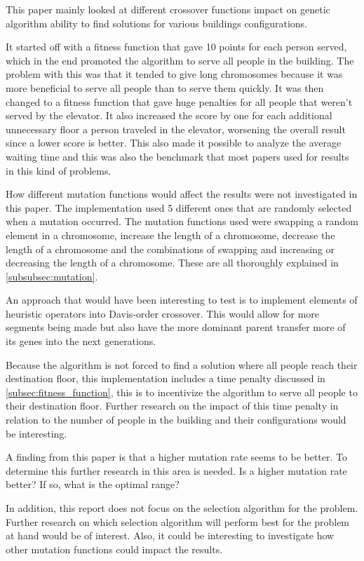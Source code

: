 
This paper mainly looked at different crossover functions impact on genetic algorithm ability to find solutions for various buildings configurations.

It started off with a fitness function that gave 10 points for each person served, which in the end promoted the algorithm to serve all people in the building.
The problem with this was that it tended to give long chromosomes because it was more beneficial to serve all people than to serve them quickly.
It was then changed to a fitness function that gave huge penalties for all people that weren't served by the elevator. It also increased the score by one for each additional unnecessary floor a person traveled in the elevator, worsening the overall result since a lower score is better.
This also made it possible to analyze the average waiting time and this was also the benchmark that most papers used for results in this kind of problems.

How different mutation functions would affect the results were not investigated in this paper. The implementation used 5 different ones that are randomly selected when a mutation occurred.
The mutation functions used were swapping a random element in a chromosome, increase the length of a chromosome, decrease the length of a chromosome and the combinations of swapping and increasing or decreasing the length of a chromosome.
These are all thoroughly explained in \ref{subsubsec:mutation}.

An approach that would have been interesting to test is to implement elements of heuristic operators into Davis-order crossover.
This would allow for more segments being made but also have the more dominant parent transfer more of its genes into the next generations.

Because the algorithm is not forced to find a solution where all people reach their destination floor, this implementation includes a time penalty discussed in \ref{subsec:fitness_function}, this is to incentivize the algorithm to serve all people to their destination floor.
Further research on the impact of this time penalty in relation to the number of people in the building and their configurations would be interesting.

A finding from this paper is that a higher mutation rate seems to be better. To determine this further research in this area is needed. Is a higher mutation rate better? If so, what is the optimal range?

In addition, this report does not focus on the selection algorithm for the problem. Further research on which selection algorithm will perform best for the problem at hand would be of interest.
Also, it could be interesting to investigate how other mutation functions could impact the results.